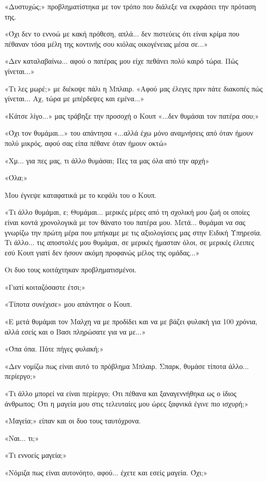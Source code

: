 \documentclass[12pt,twoside, openany]{book}
\begin{document}
«Δυστυχώς;» προβληματίστηκα με τον τρόπο που διάλεξε να εκφράσει την πρόταση της.

«Όχι δεν το εννοώ με κακή πρόθεση, απλά... δεν πιστεύεις ότι είναι κρίμα που πέθαναν τόσα μέλη της κοντινής σου κιόλας οικογένειας μέσα σε...»

«Δεν καταλαβαίνω... αφού ο πατέρας μου είχε πεθάνει πολύ καιρό τώρα. Πώς γίνεται...»

«Τι λες μωρέ;» με διέκοψε πάλι η Μπλαιρ. «Αφού μας έλεγες πριν πάτε διακοπές πώς γίνεται... Αχ, τώρα με μπέρδεψες και εμένα...»

«Κάτσε λίγο...» μας τράβηξε την προσοχή ο Κουπ «...δεν θυμάσαι τον πατέρα σου;»

«Όχι τον θυμάμαι...» του απάντησα «...αλλά έχω μόνο αναμνήσεις από όταν ήμουν πολύ μικρός, αφού σας είπα πέθανε όταν ήμουν οκτώ»

«Χμ... για πες μας, τι άλλο θυμάσαι; Πες τα μας όλα από την αρχή»

«Όλα;»

Μου έγνεψε καταφατικά με το κεφάλι του ο Κουπ.

«Τι άλλο θυμάμαι, ε; Θυμάμαι... μερικές μέρες από τη σχολική μου ζωή οι οποίες είναι κοντά χρονολογικά με τον θάνατο του πατέρα μου. Μετά... θυμάμαι να σας γνωρίζω την πρώτη μέρα που μπήκαμε με τις αξιολογίσεις μας στην Ειδική Υπηρεσία. Τι άλλο... τις αποστολές μου θυμάμαι, σε μερικές ήμασταν όλοι, σε μερικές έλειπες εσύ Κουπ γιατί δεν ήσουν ακόμη προφανώς μέλος της ομάδας...»

Οι δυο τους κοιτάχτηκαν προβληματισμένοι.

«Γιατί κοιταζόσαστε έτσι;»

«Τίποτα συνέχισε» μου απάντησε ο Κουπ.

«Ε μετά θυμάμαι τον Μαλχη να με προδίδει και να με βάζει φυλακή για 100 χρόνια, αλλά εσείς και ο Βασι πληρώσατε για να με...»

«Όπα όπα. Πότε πήγες φυλακή;»

«Δεν νομίζω πως είναι αυτό το πρόβλημα Μπλαιρ. Σπαρκ, θυμάσε τίποτα άλλο... περίεργο;»

«Τι άλλο μπορεί να είναι περίεργο; Ότι πέθανα και ξαναγεννήθηκα ως ο ίδιος άνθρωπος; Ότι η μαγεία μου στις τελευταίες μου ώρες ξαφνικά έγινε πιο ισχυρή;»

«Μαγεία;» είπαν και οι δυο τους ταυτόχρονα.

«Ναι... τι;»

«Τι εννοείς μαγεία;»

«Νόμιζα πως είναι αυτονόητο, αφού... έχετε και εσείς μαγεία. Όχι;»
\end{document}
